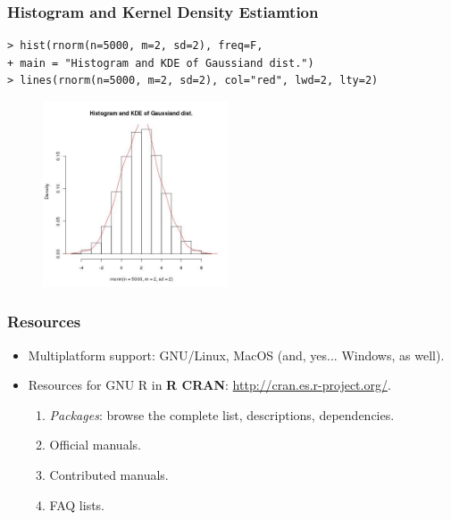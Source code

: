 \documentclass{beamer}
\begin{document}

\begin{frame}[fragile]
  
\frametitle{Histogram and Kernel Density Estiamtion}
 \begin{footnotesize}
   \begin{verbatim}
> hist(rnorm(n=5000, m=2, sd=2), freq=F, 
+ main = "Histogram and KDE of Gaussiand dist.")
> lines(rnorm(n=5000, m=2, sd=2), col="red", lwd=2, lty=2)
   \end{verbatim}
 \end{footnotesize}
\vspace{-1cm}
\begin{figure}
\includegraphics[height=5.5cm]{figs/hist.jpeg}
\end{figure}

\end{frame}


\begin{frame}

\frametitle{Resources}
 \begin{itemize}
  \item Multiplatform support: GNU/Linux, MacOS (and, yes... Windows, as well).
  \item Resources for GNU R in \textbf{R CRAN}:
  \url{http://cran.es.r-project.org/}. 
  \begin{enumerate}
   \item \textit{Packages}: browse the 
   complete list, descriptions, dependencies.
   \item Official manuals.
   \item Contributed manuals.
   \item FAQ lists.
  \end{enumerate}
 \end{itemize}

\end{frame}
\end{document}
